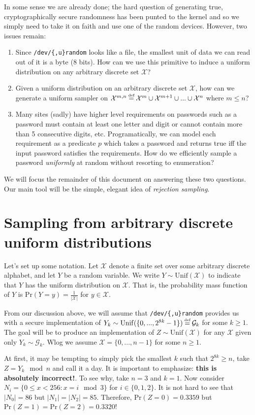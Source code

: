 \documentclass[10pt]{article}
\newcommand{\X}{\mathcal{X}}
\newcommand{\G}{\mathcal{G}}
\newcommand{\abs}[1]{\left| #1 \right|}
\newcommand{\Unif}{\mathrm{Unif}}
\renewcommand{\Pr}{\mathrm{Pr}}
\newcommand\defeq{\stackrel{\mathclap{\normalfont\tiny\mbox{def}}}{=}}
\begin{document}
In some sense we are already done; the hard question of generating true,
cryptographically secure randomness has been punted to the kernel and so we
simply need to take it on faith and use one of the random devices. However, two
issues remain:
\begin{enumerate}
  \item Since \verb|/dev/{,u}random| looks like a file, the smallest unit of data
    we can read out of it is a byte (8 bits). How can we use this primitive to induce
    a uniform distribution on any arbitrary discrete set $\X$?
  \item Given a uniform distribution on an arbitrary discrete set $\X$, how can
    we generate a uniform sampler on $\X^{m,n} \defeq \X^m \cup \X^{m+1} \cup ... \cup \X^{n}$ 
    where $m \leq n$?
  \item Many sites (sadly) have higher level requirements on passwords such as 
    a password must contain at least one letter and digit or cannot contain
    more than 5 consecutive digits, etc. Programatically, we can model each
    requirement as a predicate $p$ which takes a password and returns true iff
    the input password satisfies the requirements. How do we efficiently sample
    a password \emph{uniformly} at random without resorting to enumeration?
\end{enumerate}
We will focus the remainder of this document on answering these two questions.
Our main tool will be the simple, elegant idea of \emph{rejection sampling}. 

\section{Sampling from arbitrary discrete uniform distributions}
Let's set up some notation. Let $\X$ denote a finite set over some arbitrary
discrete alphabet, and let $Y$ be a random variable. We write $Y \sim
\Unif(\X)$ to indicate that $Y$ has the uniform distribution on $\X$.  That is,
the probability mass function of $Y$ is $\Pr(Y=y) = \frac{1}{\abs{\X}}$ for $y \in \X$.

From our discussion above, we will assume that \verb|/dev/{,u}random| provides
us with a secure implementation of $Y_k \sim \Unif(\{0, ..., 2^{8k} - 1\}) \defeq \G_k$ for some $k \geq 1$.
%
The goal will be to produce an implementation of $Z \sim \Unif(\X)$ for any
$\X$ given only $Y_k \sim \G_k$. Wlog we assume $\X = \{0, ..., n-1\}$ for some $n
\geq 1$.

At first, it may be tempting to simply pick the smallest $k$ such that $2^{8k}
\geq n$, take $Z = Y_k \mod{n}$ and call it a day. It is
important to emphasize: \textbf{this is absolutely incorrect!}.
%
To see why, take $n=3$ and $k=1$. Now consider $N_i = \{ 0 \leq x < 256 : x = i \mod{3}
\}$ for $i \in \{0,1,2\}$. It is not hard to see that $\abs{N_0} = 86$ but
$\abs{N_1}=\abs{N_2} = 85$. Therefore, $\Pr(Z=0) = 0.3359$ but
$\Pr(Z=1)=\Pr(Z=2)=0.3320$!
\end{document}
